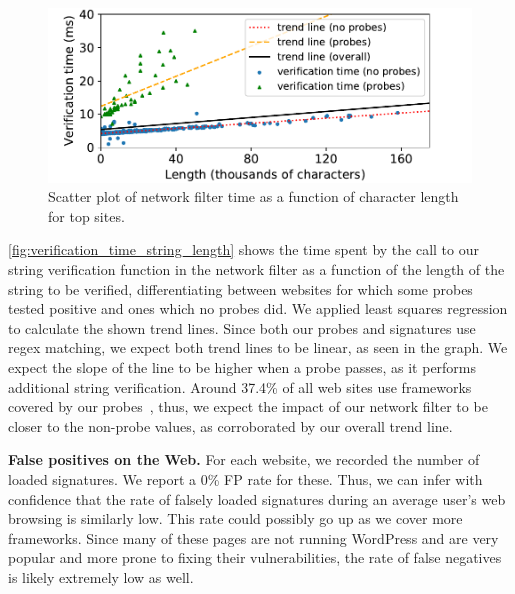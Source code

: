 \begin{figure}[h]
	\includegraphics[scale=0.5]{results/string_length_vs_verification_time_small.pdf}
	\caption{Scatter plot of network filter time as a function of character length for top sites.}
	\label{fig:verification_time_string_length}
\end{figure}

\autoref{fig:verification_time_string_length} shows the time spent by the call to our string verification function in the network filter as a function of the length of the string to be verified, differentiating between websites for which some probes tested positive and ones which no probes did. We applied least squares regression to calculate the shown trend lines. 
 Since both our probes and signatures use regex matching, we expect both trend lines to be linear, as seen in the graph. We expect the slope of the line to be higher when a probe passes, as it performs additional string verification. Around 37.4\% of all web sites use frameworks covered by our probes~\cite{w3stats}, thus, we expect the impact of our network filter to be closer to the non-probe values, as corroborated by our overall trend line.

\textbf{False positives on the Web.} For each website, we recorded the number of loaded signatures. We report a 0\% FP rate for these. Thus, we can infer with confidence that the rate of falsely loaded signatures during an average user's web browsing is similarly low. This rate could possibly go up as we cover more frameworks. Since many of these pages are not running WordPress and are very popular and more prone to fixing their vulnerabilities, the rate of false negatives is likely extremely low as well.

